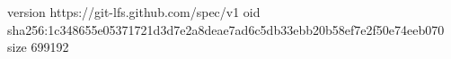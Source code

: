 version https://git-lfs.github.com/spec/v1
oid sha256:1c348655e05371721d3d7e2a8deae7ad6c5db33ebb20b58ef7e2f50e74eeb070
size 699192
